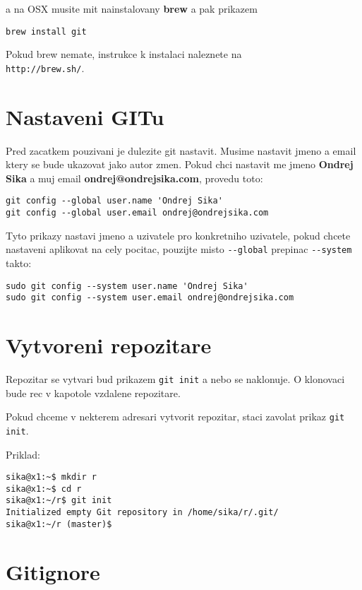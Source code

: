 \documentclass[12pt,a5paper]{article}
\begin{document}
a na OSX musite mit nainstalovany {\bf brew} a pak prikazem

\begin{lstlisting}
brew install git
\end{lstlisting}

Pokud brew nemate, instrukce k instalaci naleznete na \\
\lstinline|http://brew.sh/|.

\section{Nastaveni GITu}

Pred zacatkem pouzivani je dulezite git nastavit. Musime nastavit jmeno a email ktery se bude ukazovat jako autor zmen. Pokud chci nastavit me jmeno {\bf Ondrej Sika} a muj email {\bf ondrej@ondrejsika.com}, provedu toto:

\begin{lstlisting}
git config --global user.name 'Ondrej Sika'
git config --global user.email ondrej@ondrejsika.com
\end{lstlisting}

Tyto prikazy nastavi jmeno a uzivatele pro konkretniho uzivatele, pokud chcete nastaveni aplikovat na cely pocitac, pouzijte misto \lstinline|--global| prepinac \lstinline|--system| takto:

\begin{lstlisting}
sudo git config --system user.name 'Ondrej Sika'
sudo git config --system user.email ondrej@ondrejsika.com
\end{lstlisting}

\section{Vytvoreni repozitare}

Repozitar se vytvari bud prikazem \lstinline|git init| a nebo se naklonuje. O klonovaci bude rec v kapotole vzdalene repozitare.

Pokud chceme v nekterem adresari vytvorit repozitar, staci zavolat prikaz \lstinline|git init|.

Priklad:

\begin{lstlisting}
sika@x1:~$ mkdir r
sika@x1:~$ cd r
sika@x1:~/r$ git init
Initialized empty Git repository in /home/sika/r/.git/
sika@x1:~/r (master)$
\end{lstlisting}

\section{Gitignore}
\end{document}
